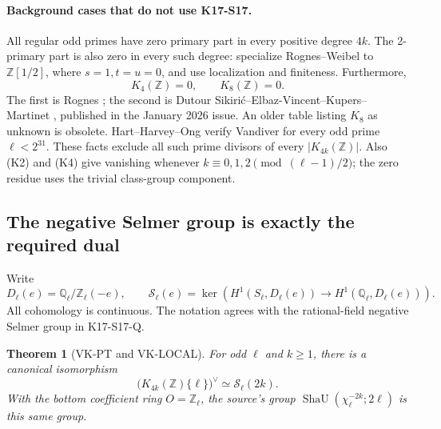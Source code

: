 \documentclass[11pt,a4paper]{article}
\newtheorem{theorem}{Theorem}[section]
\theoremstyle{definition}
\begin{document}
\paragraph{Background cases that do not use K17-S17.}
All regular odd primes have zero primary part in every positive
degree \(4k\). The 2-primary part is also zero in every such degree:
specialize Rognes--Weibel \cite[Theorem~0.7, proved as
Theorem~7.11]{RognesWeibel2000} to \(\mathbb Z[1/2]\), where
\(s=1,t=u=0\), and use localization and finiteness.
Furthermore,
\[
 K_4(\mathbb Z)=0,\qquad K_8(\mathbb Z)=0.              \tag{K4}
\]
The first is Rognes \cite[Theorem~0.1, p.~268]{Rognes2000};
the second is Dutour Sikiri\'c--Elbaz-Vincent--Kupers--Martinet
\cite[Theorem~6.4]{DEKM2026}, published in the January 2026 issue.
An older table listing \(K_8\) as unknown is obsolete.
Hart--Harvey--Ong \cite[\S1, item~(2)]{HartHarveyOng2017}
verify Vandiver for every odd prime \(\ell<2^{31}\).
These facts exclude all such prime divisors of every
\(|K_{4k}(\mathbb Z)|\). Also (K2) and (K4) give vanishing whenever
\(k\equiv0,1,2\pmod{(\ell-1)/2}\); the zero residue uses the
trivial class-group component.

\subsection{The negative Selmer group is exactly the required dual}

Write
\[
 D_\ell(e)=\mathbb Q_\ell/\mathbb Z_\ell(-e),\qquad
 \mathcal S_\ell(e)=
 \ker\!\left(H^1(S_\ell,D_\ell(e))
              \longrightarrow H^1(\mathbb Q_\ell,D_\ell(e))\right).
\]
All cohomology is continuous. The notation agrees with the
rational-field negative Selmer group in K17-S17-Q.

\begin{theorem}[VK-PT and VK-LOCAL]
For odd \(\ell\) and \(k\ge1\), there is a canonical isomorphism
\[
 \bigl(K_{4k}(\mathbb Z)\{\ell\}\bigr)^\vee
       \simeq\mathcal S_\ell(2k).                     \tag{K5}
\]
With the bottom coefficient ring \(O=\mathbb Z_\ell\), the
source's group
\(\operatorname{ShaU}(\chi_\ell^{-2k};2\ell)\)
is this same group.
\end{theorem}
\end{document}
